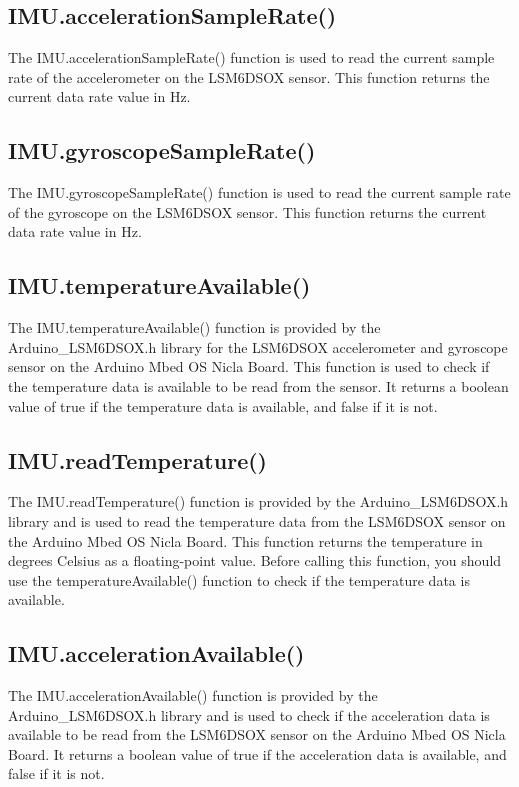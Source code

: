 \subsection{IMU.accelerationSampleRate()}
The IMU.accelerationSampleRate() function is used to read the current sample rate of the accelerometer on the LSM6DSOX sensor. This function returns the current data rate value in Hz.

\subsection{IMU.gyroscopeSampleRate()}
The IMU.gyroscopeSampleRate() function is used to read the current sample rate of the gyroscope on the LSM6DSOX sensor. This function returns the current data rate value in Hz.

\subsection{IMU.temperatureAvailable()}
The IMU.temperatureAvailable() function is provided by the Arduino\_LSM6DSOX.h library for the LSM6DSOX accelerometer and gyroscope sensor on the Arduino Mbed OS Nicla Board. This function is used to check if the temperature data is available to be read from the sensor. It returns a boolean value of true if the temperature data is available, and false if it is not.

\subsection{IMU.readTemperature()}
The IMU.readTemperature() function is provided by the Arduino\_LSM6DSOX.h library and is used to read the temperature data from the LSM6DSOX sensor on the Arduino Mbed OS Nicla Board. This function returns the temperature in degrees Celsius as a floating-point value. Before calling this function, you should use the temperatureAvailable() function to check if the temperature data is available.

\subsection{IMU.accelerationAvailable()}
The IMU.accelerationAvailable() function is provided by the Arduino\_LSM6DSOX.h library and is used to check if the acceleration data is available to be read from the LSM6DSOX sensor on the Arduino Mbed OS Nicla Board. It returns a boolean value of true if the acceleration data is available, and false if it is not.

